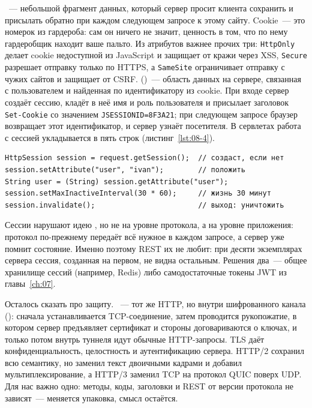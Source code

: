 ~--- небольшой фрагмент данных, который сервер просит клиента
сохранить и присылать обратно при каждом следующем запросе к этому сайту.
Cookie~--- это номерок из гардероба: сам он ничего не значит, ценность в том,
что по нему гардеробщик находит ваше пальто. Из атрибутов важнее прочих три:
\texttt{HttpOnly} делает cookie недоступной из JavaScript и защищает от кражи
через XSS, \texttt{Secure} разрешает отправку только по HTTPS, а
\texttt{SameSite} ограничивает отправку с чужих сайтов и защищает от CSRF.
 ()~--- область данных на сервере, связанная с
пользователем и найденная по идентификатору из cookie. При входе сервер создаёт
сессию, кладёт в неё имя и роль пользователя и присылает заголовок
\texttt{Set-Cookie} со значением \texttt{JSESSIONID=8F3A21}; при следующем
запросе браузер возвращает этот идентификатор, и сервер узнаёт посетителя. В
сервлетах работа с сессией укладывается в пять строк (листинг~\ref{lst:08-4}).

\begin{listing}[H]
\begin{verbatim}
HttpSession session = request.getSession();  // создаст, если нет
session.setAttribute("user", "ivan");        // положить
String user = (String) session.getAttribute("user");
session.setMaxInactiveInterval(30 * 60);     // жизнь 30 минут
session.invalidate();                        // выход: уничтожить
\end{verbatim}
\caption{Работа с сессией в сервлете}
\label{lst:08-4}
\end{listing}

Сессии нарушают идею , но не на уровне протокола, а на уровне
приложения: протокол по-прежнему передаёт всё нужное в каждом запросе, а сервер
уже помнит состояние. Именно поэтому REST их не любит: при десяти экземплярах
сервера сессия, созданная на первом, не видна остальным. Решения два~--- общее
хранилище сессий (например, Redis) либо самодостаточные токены JWT из
главы~\ref{ch:07}.

Осталось сказать про защиту. ~--- тот же HTTP, но внутри
шифрованного канала  (): сначала
устанавливается TCP-соединение, затем проводится рукопожатие, в котором сервер
предъявляет сертификат и стороны договариваются о ключах, и только потом внутрь
туннеля идут обычные HTTP-запросы. TLS даёт конфиденциальность, целостность и
аутентификацию сервера. HTTP/2 сохранил всю семантику, но заменил текст
двоичными кадрами и добавил мультиплексирование, а HTTP/3 заменил TCP на
протокол QUIC поверх UDP. Для нас важно одно: методы, коды, заголовки и REST от
версии протокола не зависят~--- меняется упаковка, смысл остаётся.

